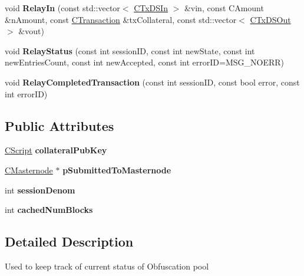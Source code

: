 \begin{DoxyCompactItemize}
\mbox{\label{class_c_obfuscation_pool_ab49e7abe067bbc0b610a12750d4f5bf2}} 
void {\bfseries Relay\+In} (const std\+::vector$<$ \mbox{\hyperlink{class_c_tx_d_s_in}{C\+Tx\+D\+S\+In}} $>$ \&vin, const C\+Amount \&n\+Amount, const \mbox{\hyperlink{class_c_transaction}{C\+Transaction}} \&tx\+Collateral, const std\+::vector$<$ \mbox{\hyperlink{class_c_tx_d_s_out}{C\+Tx\+D\+S\+Out}} $>$ \&vout)
\item 
\mbox{\label{class_c_obfuscation_pool_a7e152493086856e4a0d7614886ced692}} 
void {\bfseries Relay\+Status} (const int session\+ID, const int new\+State, const int new\+Entries\+Count, const int new\+Accepted, const int error\+ID=M\+S\+G\+\_\+\+N\+O\+E\+RR)
\item 
\mbox{\label{class_c_obfuscation_pool_a434dee83d7e11f6cbba9df9690e3d221}} 
void {\bfseries Relay\+Completed\+Transaction} (const int session\+ID, const bool error, const int error\+ID)
\end{DoxyCompactItemize}
\subsection*{Public Attributes}
\begin{DoxyCompactItemize}
\item 
\mbox{\label{class_c_obfuscation_pool_af2e3d642ff62fd2727ee48e1dc1f4f01}} 
\mbox{\hyperlink{class_c_script}{C\+Script}} {\bfseries collateral\+Pub\+Key}
\item 
\mbox{\label{class_c_obfuscation_pool_a196edb7963b31253739401526f7cef1a}} 
\mbox{\hyperlink{class_c_masternode}{C\+Masternode}} $\ast$ {\bfseries p\+Submitted\+To\+Masternode}
\item 
\mbox{\label{class_c_obfuscation_pool_ad71ee1feefa2d00f95e54a0eabf0eadf}} 
int {\bfseries session\+Denom}
\item 
\mbox{\label{class_c_obfuscation_pool_a4aa00e589dd958aad086796b9aeb4677}} 
int {\bfseries cached\+Num\+Blocks}
\end{DoxyCompactItemize}


\subsection{Detailed Description}
Used to keep track of current status of Obfuscation pool 

